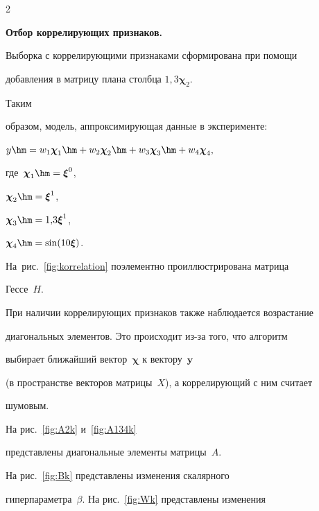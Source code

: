 \begin{multicols}{2}










\textbf{Отбор коррелирующих признаков.}

Выборка с коррелирующими признаками сформирована при помощи

добавления в матрицу плана столбца $1{,}3\boldsymbol{\chi}_2$. 

Таким

образом, модель, аппрок\-си\-ми\-ру\-ющая данные в эксперименте:

$y\hm=w_1\boldsymbol{\chi}_{1}\hm+w_2\boldsymbol{\chi}_{2}\hm+

w_3\boldsymbol{\chi}_{3}\hm+w_4\boldsymbol{\chi}_{4},$

где~$\boldsymbol{\chi}_1\hm=\boldsymbol{\xi}^0$,

$\boldsymbol{\chi}_2\hm=\boldsymbol{\xi}^1$,

$\boldsymbol{\chi}_3\hm=1{,}3\boldsymbol{\xi}^1$,

$\boldsymbol{\chi}_4\hm=\sin(10\boldsymbol{\xi})$.

На~рис.~\ref{fig:korrelation} поэлементно про\-ил\-люст\-ри\-ро\-ва\-на мат\-ри\-ца

Гессе~$H$.





При наличии коррелирующих признаков также наблюдается возрастание

диагональных элементов. Это происходит из-за того, что алгоритм

выбирает ближайший вектор~$\boldsymbol{\chi}$ к вектору~$\mathbf{y}$

(в пространстве векторов матрицы~$X$), а коррелирующий с ним считает

шумовым.



На рис.~\ref{fig:A2k} и~\ref{fig:A134k} 

представлены диагональные элементы матрицы~$A$.







На рис.~\ref{fig:Bk} представлены изменения скалярного

гиперпараметра~$\beta$. На рис.~\ref{fig:Wk} представлены изменения


\end{multicols}
